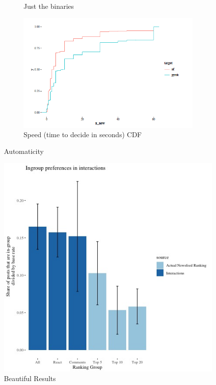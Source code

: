 \documentclass[12pt,letterpaper]{article}
\begin{document}
\begin{figure}
\begin{subfigure}{.5\textwidth}
        \caption{Just the binaries}
        \label{fig:sub-first}
    \end{subfigure}
    \begin{subfigure}{1\textwidth}
        \centering
        \includegraphics[width=.5\linewidth]{Output/Graphs/Experiments/Automaticity/speed cdf.png}  
        \caption{Speed (time to decide in seconds) CDF}
        \label{fig:sub-second}
    \end{subfigure}
\caption{Automaticity}
\end{figure}


\begin{figure}[!h]
    \centering
    \includegraphics[width=1\linewidth]{Output/Graphs/Audit/Interactions/US preferences reactions and actual rankings above base rate.jpg}
    \caption{Beautiful Results}
    \label{fig:behavior}
\end{figure}
\end{document}
